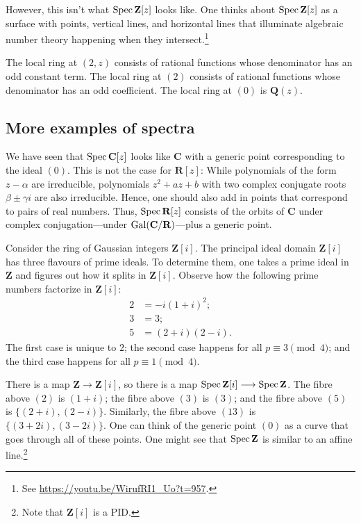 \documentclass [11 pt, oneside] {article}
\begin{document}
However, this isn't what $\operatorname{Spec} \mathbf{Z}[z]$ looks like. One thinks about $\operatorname{Spec} \mathbf{Z}[z]$ as a surface with points, vertical lines, and horizontal lines that illuminate algebraic number theory happening when they intersect.\footnote{See \url{https://youtu.be/WirufRI1_Uo?t=957}.} 

The local ring at $(2,z)$ consists of rational functions whose denominator has an odd constant term. The local ring at $(2)$ consists of rational functions whose denominator has an odd coefficient. The local ring at $(0)$ is $\mathbf{Q}(z)$.

\subsection{More examples of spectra}
\begin{example}[ ]\label{}\text{}
We have seen that $\operatorname{Spec} \mathbf{C}[z]$ looks like $\mathbf{C}$ with a generic point corresponding to the ideal $(0)$. This is not the case for $\mathbf{R}[z]$: While polynomials of the form $z-\alpha$ are irreducible, polynomials $z^2 + az + b$ with two complex conjugate roots $\beta\pm \gamma i$ are also irreducible. Hence, one should also add in points that correspond to pairs of real numbers. Thus, $\operatorname{Spec} \mathbf{R}[z]$ consists of the orbits of $\mathbf{C}$ under complex conjugation---under $\operatorname{Gal}(\mathbf{C}/\mathbf{R})$---plus a generic point.
\end{example}

\begin{example}[ ]\label{}\text{}
Consider the ring of Gaussian integers $\mathbf{Z}[i]$. The principal ideal domain $\mathbf{Z}[i]$ has three flavours of prime ideals. To determine them, one takes a prime ideal in $\mathbf{Z}$ and figures out how it splits in $\mathbf{Z}[i]$. Observe how the following prime numbers factorize in $\mathbf{Z}[i]$:
\begin{align*}
	2 &= -i (1+i)^2;\\ 
	3 &= 3;\\
	5 &= (2+i) (2-i).
\end{align*}
The first case is unique to $2$; the second case happens for all $p\equiv 3\pmod 4$; and the third case happens for all $p\equiv 1\pmod 4$.

There is a map $\mathbf{Z}\longrightarrow \mathbf{Z}[i]$, so there is a map $\operatorname{Spec} \mathbf{Z}[i]\longrightarrow \operatorname{Spec} \mathbf{Z}$. The fibre above $(2)$ is $(1+i)$; the fibre above $(3)$ is $(3)$; and the fibre above $(5)$ is $\{(2+i),  (2-i)\}$. Similarly, the fibre above $(13)$ is $\{(3+2i),  (3-2i)\}$. One can think of the generic point $(0)$ as a curve that goes through all of these points. One might see that $\operatorname{Spec} \mathbf{Z}$ is similar to an affine line.\footnote{Note that $\mathbf{Z}[i]$ is a PID.}
\end{example}
\end{document}
